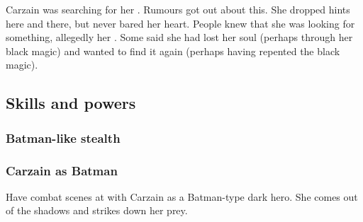 Carzain was searching for her .
Rumours got out about this. 
She dropped hints here and there, but never bared her heart. 
People knew that she was looking for something, allegedly her . 
Some said she had lost her soul (perhaps through her black magic) and wanted to find it again (perhaps having repented the black magic). 









\subsection{Skills and powers}





\subsubsection{Batman-like stealth}






\subsubsection{Carzain as Batman}
Have combat scenes at \Forclin with Carzain as a Batman-type dark hero. 
She comes out of the shadows and strikes down her prey. 





